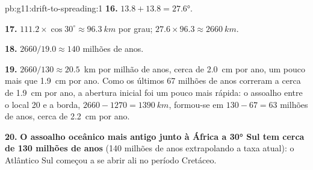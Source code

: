 \begin{solution}{pb:g11:drift-to-spreading:1}
\textbf{16.} $13.8 + 13.8 = \ang{27.6}$.

\textbf{17.} $111.2 \times \cos 30^\circ \approx \qty{96.3}{km}$ por grau;
$27.6 \times 96.3 \approx \qty{2660}{km}$.

\textbf{18.} $2660/19.0 \approx 140$ milhões de anos.

\textbf{19.} $2660/130 \approx \num{20.5}$~km por milhão de anos, cerca de
\qty{2.0}{cm} por ano, um pouco mais que \qty{1.9}{cm} por ano. Como os
últimos 67 milhões de anos correram a cerca de \qty{1.9}{cm} por ano, a
abertura inicial foi um pouco mais rápida: o assoalho entre o local 20 e a
borda, $2660 - 1270 =
\qty{1390}{km}$, formou-se em $130 - 67 = 63$ milhões de anos, cerca de
\qty{2.2}{cm} por ano.

\textbf{20.} \textbf{O assoalho oceânico mais antigo junto à África a
\ang{30} Sul tem cerca de 130 milhões de anos} (140 milhões de anos
extrapolando a taxa atual): o Atlântico Sul começou a se abrir ali no
período Cretáceo.
\end{solution}
